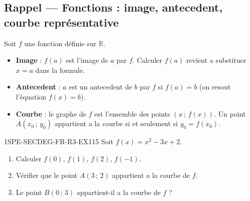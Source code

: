 

\subsection*{Rappel — Fonctions : image, antecedent, courbe représentative}

Soit $f$ une fonction définie sur $\mathbb{R}$.

\begin{itemize}
  \item \textbf{Image} : $f(a)$ est l'image de $a$ par $f$. Calculer $f(a)$ revient a substituer $x = a$ dans la formule.
  \item \textbf{Antecedent} : $a$ est un antecedent de $b$ par $f$ si $f(a) = b$ (on resout l'équation $f(x) = b$).
  \item \textbf{Courbe} : le graphe de $f$ est l'ensemble des points $(x\,;\,f(x))$.
  Un point $A(x_0\,;\,y_0)$ appartient a la courbe si et seulement si $y_0 = f(x_0)$.
\end{itemize}


\begin{exercice}{1SPE-SECDEG-FR-R3-EX1}{1}{5}
Soit $f(x) = x^2 - 3x + 2$.
\begin{enumerate}
  \item Calculer $f(0)$, $f(1)$, $f(2)$, $f(-1)$.
  \item Vérifier que le point $A(3\,;\,2)$ appartient a la courbe de $f$.
  \item Le point $B(0\,;\,3)$ appartient-il a la courbe de $f$ ?
\end{enumerate}
\end{exercice}


